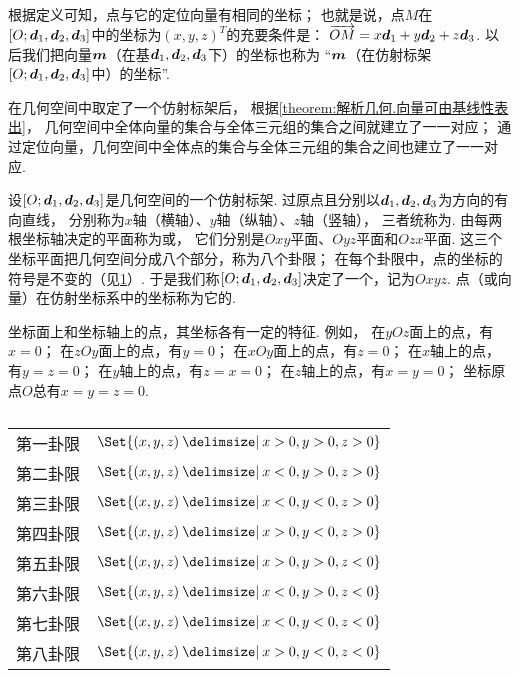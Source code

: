 根据定义可知，点与它的定位向量有相同的坐标；
也就是说，点\(M\)在\([O;\boldsymbol{d}_1,\boldsymbol{d}_2,\boldsymbol{d}_3]\)中的坐标为\((x,y,z)^T\)的充要条件是：
\(\overrightarrow{OM} = x \boldsymbol{d}_1 + y \boldsymbol{d}_2 + z \boldsymbol{d}_3\).
以后我们把向量\(\boldsymbol{m}\)（在基\(\boldsymbol{d}_1,\boldsymbol{d}_2,\boldsymbol{d}_3\)下）的坐标也称为
“\(\boldsymbol{m}\)（在仿射标架\([O;\boldsymbol{d}_1,\boldsymbol{d}_2,\boldsymbol{d}_3]\)中）的坐标”.

在几何空间中取定了一个仿射标架后，
根据\cref{theorem:解析几何.向量可由基线性表出}，
几何空间中全体向量的集合与全体三元组的集合之间就建立了一一对应；
通过定位向量，几何空间中全体点的集合与全体三元组的集合之间也建立了一一对应.

设\([O;\boldsymbol{d}_1,\boldsymbol{d}_2,\boldsymbol{d}_3]\)是几何空间的一个仿射标架.
过原点且分别以\(\boldsymbol{d}_1,\boldsymbol{d}_2,\boldsymbol{d}_3\)为方向的有向直线，
分别称为\(x\)轴（横轴）、\(y\)轴（纵轴）、\(z\)轴（竖轴），
三者统称为.
由每两根坐标轴决定的平面称为或，
它们分别是\(Oxy\)平面、\(Oyz\)平面和\(Ozx\)平面.
这三个坐标平面把几何空间分成八个部分，称为八个卦限；
在每个卦限中，点的坐标的符号是不变的（见\cref{table:解析几何.几何空间的八个卦限}）.
于是我们称\([O;\boldsymbol{d}_1,\boldsymbol{d}_2,\boldsymbol{d}_3]\)决定了一个，记为\(Oxyz\).
点（或向量）在仿射坐标系中的坐标称为它的.

坐标面上和坐标轴上的点，其坐标各有一定的特征.
例如，
在\(yOz\)面上的点，有\(x=0\)；
在\(zOy\)面上的点，有\(y=0\)；
在\(xOy\)面上的点，有\(z=0\)；
在\(x\)轴上的点，有\(y=z=0\)；
在\(y\)轴上的点，有\(z=x=0\)；
在\(z\)轴上的点，有\(x=y=0\)；
坐标原点\(O\)总有\(x=y=z=0\).

\begin{table}
\centering
\def\guaxian#1#2#3{\Set{ (x,y,z) \given x #1 0, y #2 0, z #3 0 }}%
\def\arraystretch{1.2}%
\begin{tabular}{cl}%
第一卦限 & \(\guaxian{>}{>}{>}\) \\
第二卦限 & \(\guaxian{<}{>}{>}\) \\
第三卦限 & \(\guaxian{<}{<}{>}\) \\
第四卦限 & \(\guaxian{>}{<}{>}\) \\
第五卦限 & \(\guaxian{>}{>}{<}\) \\
第六卦限 & \(\guaxian{<}{>}{<}\) \\
第七卦限 & \(\guaxian{<}{<}{<}\) \\
第八卦限 & \(\guaxian{>}{<}{<}\) \\
\end{tabular}%
\caption{}
\label{table:解析几何.几何空间的八个卦限}
\end{table}


